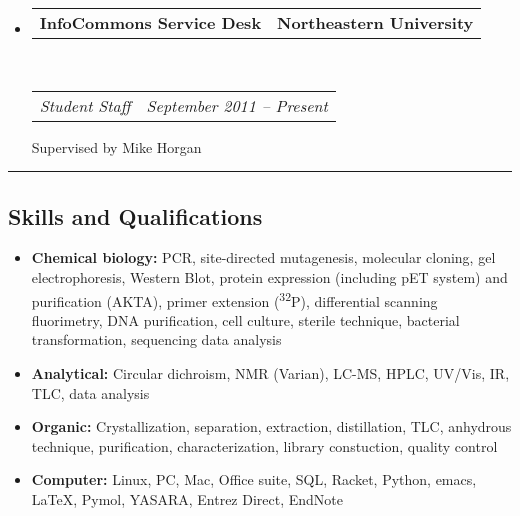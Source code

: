 \documentclass[10pt,letterpaper]{article}
\makeatletter
\newenvironment{indentsection}[1]%
{\begin{list}{}%
  {\setlength{\leftmargin}{#1}}%
  \item[]%
}
{\end{list}}
\newcommand{\headerrow}[2]
{\begin{tabular*}{\linewidth}{l@{\extracolsep{\fill}}r}
  #1 &
  #2 \\
\end{tabular*}}
\makeatother
\begin{document}
\begin{itemize}
\item
  \headerrow
      {\textbf{InfoCommons Service Desk}}
      {\textbf{Northeastern University}}
  \\
  \headerrow
      {\emph{Student Staff}}
      {\emph{September 2011 -- Present}}
      Supervised by Mike Horgan
\end{itemize}
\hrule
\vspace{-0.4em}

\subsection*{Skills and Qualifications}

\begin{itemize}
  \item \textbf{Chemical biology:}
    PCR, site-directed mutagenesis, molecular cloning,
    gel electrophoresis, Western Blot, protein expression (including pET
    system) and purification (AKTA), primer extension
  (\textsuperscript{32}P), differential scanning fluorimetry, DNA
    purification, cell culture, sterile technique, bacterial
    transformation, sequencing data analysis
  \item \textbf{Analytical:}
    Circular dichroism, NMR (Varian), LC-MS, HPLC, UV/Vis, IR, TLC, data analysis
  \item \textbf{Organic:}
    Crystallization, separation, extraction, distillation, TLC,
    anhydrous technique, purification, characterization, library constuction,
    quality control
  \item \textbf{Computer:}
    Linux, PC, Mac, Office suite, SQL, Racket, Python, emacs, LaTeX,
    Pymol, YASARA, Entrez Direct, EndNote
\end{itemize}
\end{document}
